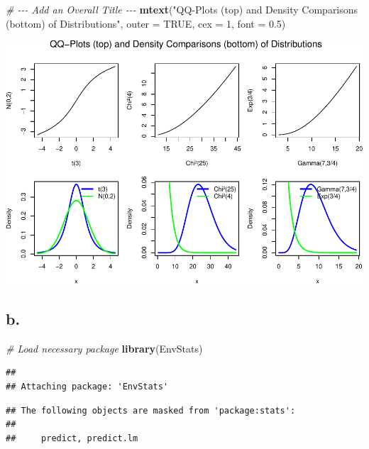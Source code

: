 \documentclass[
]{article}
\newenvironment{Shaded}{\begin{snugshade}}{\end{snugshade}}
\newcommand{\AttributeTok}[1]{\textcolor[rgb]{0.13,0.29,0.53}{#1}}
\newcommand{\CommentTok}[1]{\textcolor[rgb]{0.56,0.35,0.01}{\textit{#1}}}
\newcommand{\ConstantTok}[1]{\textcolor[rgb]{0.56,0.35,0.01}{#1}}
\newcommand{\DecValTok}[1]{\textcolor[rgb]{0.00,0.00,0.81}{#1}}
\newcommand{\FloatTok}[1]{\textcolor[rgb]{0.00,0.00,0.81}{#1}}
\newcommand{\FunctionTok}[1]{\textcolor[rgb]{0.13,0.29,0.53}{\textbf{#1}}}
\newcommand{\NormalTok}[1]{#1}
\newcommand{\StringTok}[1]{\textcolor[rgb]{0.31,0.60,0.02}{#1}}
\begin{document}
\begin{Shaded}
\begin{Highlighting}[]
\CommentTok{\# {-}{-}{-} Add an Overall Title {-}{-}{-}}
\FunctionTok{mtext}\NormalTok{(}\StringTok{"QQ{-}Plots (top) and Density Comparisons (bottom) of Distributions"}\NormalTok{, }\AttributeTok{outer =} \ConstantTok{TRUE}\NormalTok{, }\AttributeTok{cex =} \DecValTok{1}\NormalTok{, }\AttributeTok{font =} \FloatTok{0.5}\NormalTok{)}
\end{Highlighting}
\end{Shaded}

\includegraphics{SDA_A2_files/figure-latex/unnamed-chunk-1-1.pdf}

\subsection{b.}\label{b.}

\begin{Shaded}
\begin{Highlighting}[]
\CommentTok{\# Load necessary package}
\FunctionTok{library}\NormalTok{(EnvStats)}
\end{Highlighting}
\end{Shaded}

\begin{verbatim}
## 
## Attaching package: 'EnvStats'
\end{verbatim}

\begin{verbatim}
## The following objects are masked from 'package:stats':
## 
##     predict, predict.lm
\end{verbatim}
\end{document}
